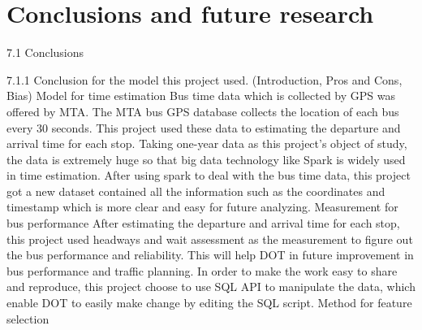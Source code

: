 \documentclass[12pt,journal,compsoc]{IEEEtran}
\begin{document}
\section{Conclusions and future research}

7.1 Conclusions

7.1.1 Conclusion for the model this project used. (Introduction, Pros and Cons, Bias)
Model for time estimation
Bus time data which is collected by GPS was offered by MTA. The MTA bus GPS database collects the location of each bus every 30 seconds. This project used these data to estimating the departure and arrival time for each stop.
Taking one-year data as this project’s object of study, the data is extremely huge so that big data technology like Spark is widely used in time estimation.
After using spark to deal with the bus time data, this project got a new dataset contained all the information such as the coordinates and timestamp which is more clear and easy for future analyzing.
Measurement for bus performance
After estimating the departure and arrival time for each stop, this project used headways and wait assessment as the measurement to figure out the bus performance and reliability. This will help DOT in future improvement in bus performance and traffic planning.
 In order to make the work easy to share and reproduce, this project choose to use SQL API to manipulate the data, which enable DOT to easily make change by editing the SQL script. 
Method for feature selection
\end{document}
